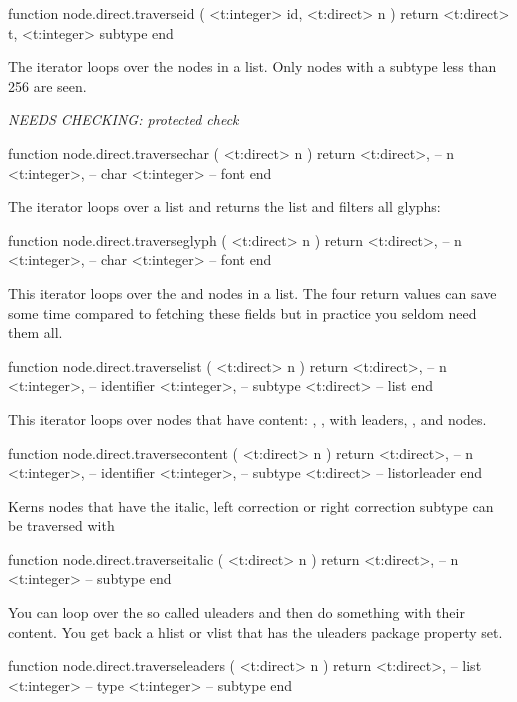 \starttyping[option=LUA]
function node.direct.traverseid ( <t:integer> id, <t:direct> n )
    return
        <t:direct>  t,
        <t:integer> subtype
end
\stoptyping

The  iterator loops over the  nodes in a list.
Only nodes with a subtype less than 256 are seen.

{\em NEEDS CHECKING: protected check}

\starttyping[option=LUA]
function node.direct.traversechar ( <t:direct> n )
    return
        <t:direct>,  -- n
        <t:integer>, -- char
        <t:integer>  -- font
end
\stoptyping

The  iterator loops over a list and returns the list and
filters all glyphs:

\starttyping[option=LUA]
function node.direct.traverseglyph ( <t:direct> n )
    return
        <t:direct>,  -- n
        <t:integer>, -- char
        <t:integer>  -- font
end
\stoptyping

This iterator loops over the  and  nodes in a list. The
four return values can save some time compared to fetching these fields but in
practice you seldom need them all.

\starttyping[option=LUA]
function node.direct.traverselist ( <t:direct> n )
    return
        <t:direct>,  -- n
        <t:integer>, -- identifier
        <t:integer>, -- subtype
        <t:direct>   -- list
end
\stoptyping

This iterator loops over nodes that have content: , ,
 with leaders, ,  and  nodes.

\starttyping[option=LUA]
function node.direct.traversecontent ( <t:direct> n )
    return
        <t:direct>,  -- n
        <t:integer>, -- identifier
        <t:integer>, -- subtype
        <t:direct>   -- listorleader
end
\stoptyping

Kerns nodes that have the italic, left correction or right correction subtype can
be traversed with

\starttyping[option=LUA]
function node.direct.traverseitalic ( <t:direct> n )
    return
        <t:direct>, -- n
        <t:integer> -- subtype
end
\stoptyping

You can loop over the so called uleaders and then do something with their
content. You get back a hlist or vlist that has the uleaders package property
set.

\starttyping[option=LUA]
function node.direct.traverseleaders ( <t:direct> n )
    return
        <t:direct>, -- list
        <t:integer> -- type
        <t:integer> -- subtype
end
\stoptyping

